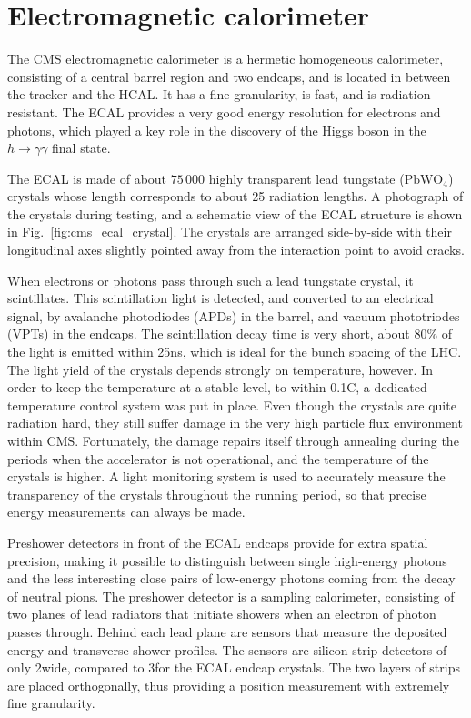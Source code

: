 \section{Electromagnetic calorimeter \label{sec:cms_ecal}}

The CMS electromagnetic calorimeter is a hermetic homogeneous calorimeter, consisting of a central
barrel region and two endcaps, and is located in between the tracker and the HCAL. 
It has a fine granularity, is fast, and is radiation resistant.
The ECAL provides a very good energy resolution for electrons and photons, which played a key role
in the discovery of the Higgs boson in the $h\rightarrow\gamma\gamma$ final state. 

The ECAL is made of about $75\,000$ highly transparent lead tungstate ($\text{PbWO}_\text{4}$)
crystals whose length corresponds to about 25 radiation lengths. A photograph of the crystals
during testing, and a schematic view of the ECAL structure is shown in
Fig.~\ref{fig:cms_ecal_crystal}. The crystals are arranged side-by-side with their longitudinal axes
slightly pointed away from the interaction point to avoid cracks.

When electrons or photons pass through such a lead tungstate crystal, it scintillates. 
This scintillation light is detected, and converted to an electrical signal, by avalanche
photodiodes (APDs) in the barrel, and vacuum phototriodes (VPTs) in the endcaps.
The scintillation decay time is very short, about 80\% of the light is emitted within 25\unit{ns},
which is ideal for the bunch spacing of the LHC. 
The light yield of the crystals depends strongly on temperature, however. In order to keep the
temperature at a stable level, to within 0.1\de C, a dedicated temperature control system was put in
place.
Even though the crystals are quite radiation hard, they still suffer damage in the very high
particle flux environment within CMS. Fortunately, the damage repairs itself through annealing
during the periods when the accelerator is not operational, and the temperature of the crystals is
higher. A light monitoring system is used to accurately measure the transparency of the crystals
throughout the running period, so that precise energy measurements can always be made. 

Preshower detectors in front of the ECAL endcaps provide for extra spatial precision, making it
possible to distinguish between single high-energy photons and the less interesting close pairs of
low-energy photons coming from the decay of neutral pions.
The preshower detector is a sampling calorimeter, consisting of two planes of lead radiators that
initiate showers when an electron of photon passes through. Behind each lead plane are sensors that
measure the deposited energy and transverse shower profiles. 
The sensors are silicon strip detectors of only 2\mm wide, compared to 3\cm for the ECAL endcap
crystals. The two layers of strips are placed orthogonally, thus providing a position
measurement with extremely fine granularity. 


